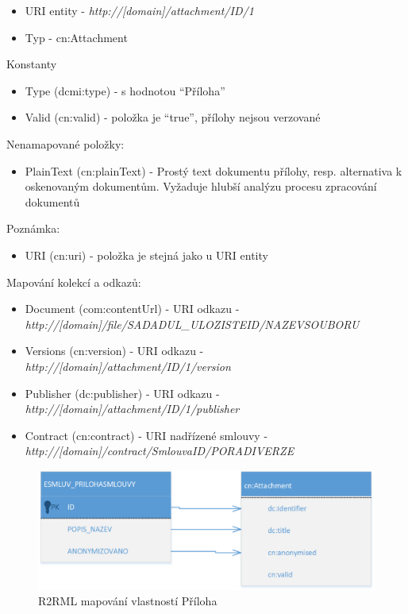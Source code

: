 \begin{itemize}
\item URI entity  - \textit{http://[domain]/attachment/{ID}/1}
\item Typ - cn:Attachment
\end{itemize}

Konstanty
\begin{itemize}
\item Type (dcmi:type) - s hodnotou “Příloha”
\item Valid (cn:valid) - položka je “true”, přílohy nejsou verzované
\end{itemize}

Nenamapované položky:
\begin{itemize}
\item PlainText (cn:plainText) - Prostý text dokumentu přílohy, resp. alternativa k oskenovaným dokumentům. Vyžaduje hlubší analýzu procesu zpracování dokumentů 
\end{itemize}

Poznámka:
\begin{itemize}
\item URI (cn:uri) - položka je stejná jako u URI entity
\end{itemize}

Mapování kolekcí a odkazů:

\begin{itemize}
\item Document (com:contentUrl) - URI odkazu -\\\textit{http://[domain]/file/{SADADUL\_ULOZISTEID}/{NAZEVSOUBORU}}
\item Versions (cn:version) - URI odkazu -\\\textit{http://[domain]/attachment/{ID}/1/version}
\item Publisher (dc:publisher) - URI odkazu -\\\textit{http://[domain]/attachment/{ID}/1/publisher}
\item Contract (cn:contract) - URI nadřízené smlouvy -\\\textit{http://[domain]/contract/{SmlouvaID}/{PORADIVERZE}}
\end{itemize}

\begin{figure}[H]
\centerline{\includegraphics[width=\textwidth]{img/mapAttachment.eps}}
\caption{R2RML mapování vlastností Příloha}
\label{obr:mapAttachment}
\end{figure}

